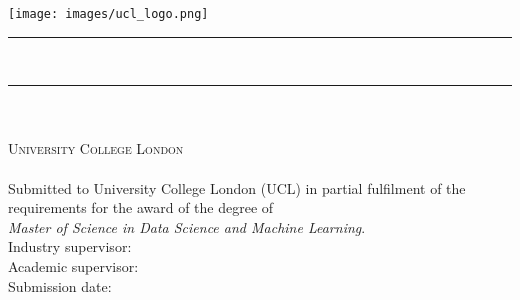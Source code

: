 \begin{singlespace}
    \begin{titlepage}
        \center{}
        \texttt{[image: images/ucl\_logo.png]} \vspace{0.5cm}

        \rule{\linewidth}{0.5mm} \\[0.5cm]
            { \begin{spacing}{1}
            	\HUGE \textsc{\thesisTitle}
              \end{spacing}}
        \rule{\linewidth}{0.5mm} \\[1cm]
		

        \huge \textbf{\textsc{\authorName}}\\
        \textsc{\LARGE University College London}\\
        \textsc{\LARGE \department}\\[2cm]

        {\Large Submitted to University College London (UCL) in partial fulfilment of the requirements for the award of the degree of \\ \textit{Master of Science in Data Science and Machine Learning}.}\\[2cm]

        {\Large Industry supervisor: \primarySupervisor}\\
        {\Large Academic supervisor: \secondarySupervisor}\\[2cm]

        {\Large Submission date: \submissionDate}
    \end{titlepage}
\end{singlespace}

%

